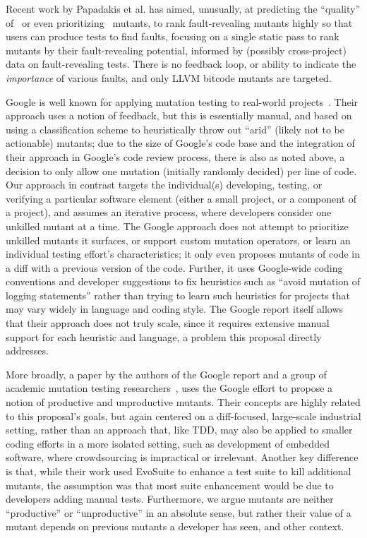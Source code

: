 Recent work by Papadakis et al. has
aimed, unusually, at predicting the ``quality'' of~\cite{MutQuality}
or even prioritizing~\cite{FaRM} mutants, to rank fault-revealing
mutants highly so that users can produce tests to find faults, focusing on a single static
pass to rank mutants by their fault-revealing potential, informed by
(possibly cross-project)
data on fault-revealing tests.  There is no feedback loop, or ability
to indicate the \emph{importance} of various faults, and only LLVM
bitcode mutants are targeted.  %

Google is well known for applying mutation
testing to real-world projects~\cite{MutGoogle}.  Their approach 
uses a notion of feedback, but this is  essentially manual, and based on
using a classification scheme to heuristically throw out ``arid''
(likely not to be actionable)
mutants; due to the size of Google's code base and the integration of
their approach in Google's code review process, there is also as noted
above, a
decision to only allow one mutation (initially randomly decided) per
line of code.  
Our approach in contrast targets the individual(s) developing, testing, or verifying a particular software
element (either a small project, or a component of a project), and
assumes an iterative process, where developers consider one unkilled
mutant at a time.  The Google approach does not attempt to prioritize
unkilled mutants it surfaces, or support custom mutation
operators, or learn an individual testing effort's characteristics; it only even
proposes mutants of code in a diff with a previous version of the
code.  Further, it uses
Google-wide coding conventions and developer suggestions to fix
heuristics such as ``avoid mutation of logging statements'' rather
than trying to learn such heuristics for
projects that may vary widely in language and coding style.  The Google report
itself allows that their approach does not truly scale, since it
requires extensive manual support for each heuristic and language, a
problem this proposal directly addresses.

More broadly, a paper by the
authors of the Google report and a group of academic mutation testing
researchers~\cite{ivankovic2018industrial}, uses the Google effort to
propose a notion of productive and unproductive mutants.  Their
concepts are highly related to this proposal's goals, but again centered on a
diff-focused, large-scale industrial setting, rather than an approach
that, like TDD, may also be applied to smaller coding efforts in a more
isolated setting, such as development of embedded software, where
crowdsourcing is impractical or irrelevant.  Another key difference is that, while their
work used EvoSuite to enhance a test suite to kill additional mutants,
the assumption was that most suite enhancement would be due to
developers adding manual tests.  Furthermore, we argue mutants
are neither ``productive'' or ``unproductive'' in an absolute sense, but
rather their value of a mutant depends on previous mutants a
developer has seen, and other context.



